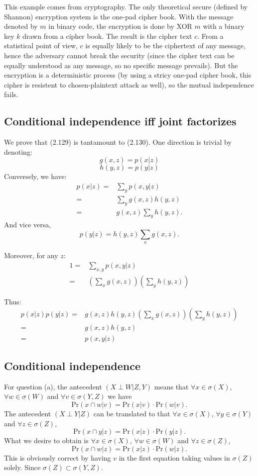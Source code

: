 \documentclass[UTF8]{ctexart}
\begin{document}
This example comes from cryptography. 
The only theoretical secure (defined by Shannon) encryption system is the one-pad cipher book. 
With the message denoted by $m$ in binary code, the encryption is done by XOR $m$ with a binary key $k$ drawn from a cipher book. 
The result is the cipher text $c$. 
From a statistical point of view, $c$ is equally likely to be the ciphertext of any message, hence the adversary cannot break the security (since the cipher text can be equally understood as any message, so no specific message prevails). 
But the encryption is a deterministic process (by using a stricy one-pad cipher book, this cipher is resistent to chosen-plaintext attack as well), so the mutual independence fails. 

\subsection{Conditional independence iff joint factorizes}
We prove that (2.129) is tantamount to (2.130).
One direction is trivial by denoting:
$$g(x,z)=p(x|z)$$
$$h(y,z)=p(y|z)$$
Conversely, we have:
$$
\begin{aligned}
p(x|z)=&\sum_{y}p(x,y|z)  \\
=&\sum_{y}g(x,z)h(y,z)  \\
=&g(x,z)\sum_{y}h(y,z). 
\end{aligned}
$$
And vice versa,
$$p(y|z)=h(y,z)\sum_{x}g(x,z).$$ 

Moreover, for any $z$:
\begin{align}
1=&\sum_{x,y}p(x,y|z) \nonumber \\
=&(\sum_{x}g(x,z))(\sum_{y}h(y,z)) \nonumber
\end{align}

Thus:
\begin{align}
p(x|z)p(y|z)=&g(x,z)h(y,z)(\sum_{x}g(x,z))(\sum_{y}h(y,z)) \nonumber \\
=&g(x,z)h(y,z) \nonumber \\
=&p(x,y|z) \nonumber
\end{align}

\subsection{Conditional independence}
For question (a), the antecedent $(X\perp W|Z,Y)$ means that $\forall x\in\sigma(X)$, $\forall w\in\sigma(W)$ and $\forall v\in\sigma(Y,Z)$ we have
$$\text{Pr}(x\cap w|v)=\text{Pr}(x|v)\cdot\text{Pr}(w|v).$$
The antecedent $(X\perp Y|Z)$ can be translated to that $\forall x\in\sigma(X)$, $\forall y\in\sigma(Y)$ and $\forall z\in\sigma(Z)$,
$$\text{Pr}(x\cap y|z)=\text{Pr}(x|z)\cdot\text{Pr}(y|z).$$
What we desire to obtain is $\forall x\in\sigma(X)$, $\forall w\in\sigma(W)$ and $\forall z\in\sigma(Z)$,
$$\text{Pr}(x\cap w|z)=\text{Pr}(x|z)\cdot\text{Pr}(w|z).$$
This is obviously correct by having $v$ in the first equation taking values in $\sigma(Z)$ solely. 
Since $\sigma(Z)\subset \sigma(Y,Z)$.
\end{document}
